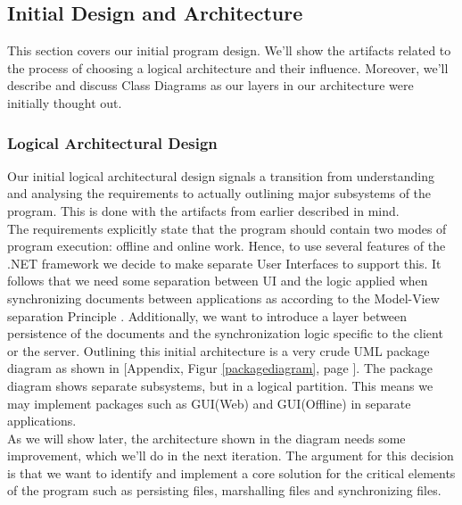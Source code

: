 \subsection{Initial Design and Architecture}
This section covers our initial program design. We’ll show the artifacts related to the process of choosing a logical architecture and their influence. Moreover, we’ll describe and discuss Class Diagrams as our layers in our architecture were initially thought out. 
\subsubsection{Logical Architectural Design}
Our initial logical architectural design signals a transition from understanding and analysing the requirements to actually outlining major subsystems of the program. This is done with the artifacts from earlier described in mind.\\
The requirements explicitly state that the program should contain two modes of program execution: offline and online work. Hence, to use several features of the .NET framework we decide to make separate User Interfaces to support this. It follows that we need some separation between UI and the logic applied when synchronizing documents between applications as according to the Model-View separation Principle \cite[p.~209]{OOAD}. Additionally, we want to introduce a layer between persistence of the documents and the synchronization logic specific to the client or the server. Outlining this initial architecture is a very crude UML package diagram as shown in [Appendix, Figur \ref{packagediagram}, page \pageref{packagediagram}].
The package diagram shows separate subsystems, but in a logical partition. This means we may implement packages such as GUI(Web) and GUI(Offline) in separate applications.\\
As we will show later, the architecture shown in the diagram needs some improvement, which we’ll do in the next iteration. The argument for this decision is that we want to identify and implement a core solution for the critical elements of the program such as persisting files, marshalling files and synchronizing files.\\
